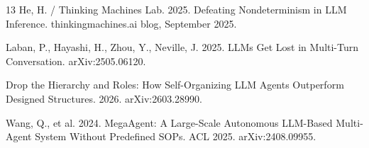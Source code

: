 \documentclass[11pt]{article}
\begin{document}
\begin{thebibliography}{13}
He, H. / Thinking Machines Lab. 2025.
\newblock Defeating Nondeterminism in LLM Inference.
\newblock thinkingmachines.ai blog, September 2025.

Laban, P., Hayashi, H., Zhou, Y., Neville, J. 2025.
\newblock LLMs Get Lost in Multi-Turn Conversation.
\newblock arXiv:2505.06120.

Drop the Hierarchy and Roles: How Self-Organizing LLM Agents Outperform
Designed Structures. 2026.
\newblock arXiv:2603.28990.

Wang, Q., et al. 2024.
\newblock MegaAgent: A Large-Scale Autonomous LLM-Based Multi-Agent System
Without Predefined SOPs.
\newblock ACL 2025. arXiv:2408.09955.

\end{thebibliography}
\end{document}
